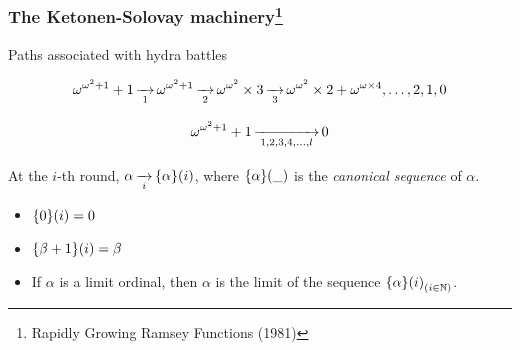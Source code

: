 \documentclass[10pt, fleqn]{beamer}
\begin{document}
\begin{frame}
  \frametitle{The Ketonen-Solovay machinery\footnote{Rapidly Growing {R}amsey Functions (1981)}}
    \begin{block}{Paths associated with hydra battles}
      {\color{mathcolor}
      $$\omega^{\omega^2+1}+1 \rplus{1} \omega^{\omega^2+1}
      \rplus{2} \omega^{\omega^2}\times 3 
      \rplus{3} \omega^{\omega^2}\times 2 +
      \omega ^ {\omega \times 4}, \dots,2,1,0$$

      \vspace{6pt}
      
      $$ \omega^{\omega^2+1}+1 \rplus{1,2,3,4,\dots,l} 0$$}
    \end{block}
    
      \begin{block}{}
        At the $i$-th round, 
           \textcolor{mathcolor}{$\alpha \rplus{i} \canonseq{\alpha}{i}$},
           where \textcolor{mathcolor}{$\mbox{$\{\alpha\}(\_)$}$} is the \emph{canonical sequence} of \textcolor{mathcolor}{$\alpha$}.
          
             \begin{itemize}
             \item  \textcolor{mathcolor}{$\mbox{$\{0\}(i)$}=0$}
             \item \textcolor{mathcolor}{$\mbox{$\{\beta+1\}(i)$}=\beta$}
             \item If \textcolor{mathcolor}{$\alpha$} is a limit ordinal, then \textcolor{mathcolor}{$\alpha$} is the limit of the sequence
               \textcolor{mathcolor}{$\mbox{$\{\alpha\}(i)$}_{ (i\in\mathbb{N})}$}.
             \end{itemize}
           \end{block}
  
    
    
 
   
 
  \end{frame}
\end{document}
